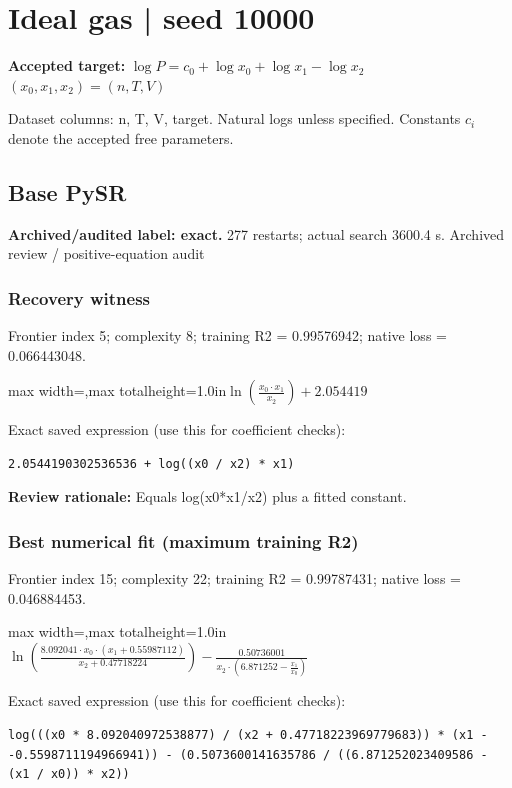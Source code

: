 \documentclass[10pt,letterpaper,landscape]{article}
\begin{document}
\section*{Ideal gas | seed 10000}
\textbf{Accepted target:} $\displaystyle \log P=c_0+\log x_0+\log x_1-\log x_2$\hfill $(x_0,x_1,x_2)=(n,T,V)$\par
{\small Dataset columns: n, T, V, target. Natural logs unless specified. Constants $c_i$ denote the accepted free parameters.}\par\medskip
\begin{minipage}[t]{0.485\textwidth}
\subsection*{Base PySR}
\textbf{Archived/audited label: exact.} 277 restarts; actual search 3600.4 s.
{\small Archived review / positive-equation audit}
\subsubsection*{Recovery witness}
Frontier index 5; complexity 8; training R2 = 0.99576942; native loss = 0.066443048.
\begin{center}\begin{adjustbox}{max width=\linewidth,max totalheight=1.0in}$\displaystyle \ln{\left(\frac{x_{0} \cdot x_{1}}{x_{2}} \right)} + 2.054419$\end{adjustbox}\end{center}
{\scriptsize Exact saved expression (use this for coefficient checks):}
\begin{lstlisting}
2.0544190302536536 + log((x0 / x2) * x1)
\end{lstlisting}
{\small\textbf{Review rationale:} Equals log(x0*x1/x2) plus a fitted constant.}
\subsubsection*{Best numerical fit (maximum training R2)}
Frontier index 15; complexity 22; training R2 = 0.99787431; native loss = 0.046884453.
\begin{center}\begin{adjustbox}{max width=\linewidth,max totalheight=1.0in}$\displaystyle \ln{\left(\frac{8.092041 \cdot x_{0} \cdot \left(x_{1} + 0.55987112\right)}{x_{2} + 0.47718224} \right)} - \frac{0.50736001}{x_{2} \cdot \left(6.871252 - \frac{x_{1}}{x_{0}}\right)}$\end{adjustbox}\end{center}
{\scriptsize Exact saved expression (use this for coefficient checks):}
\begin{lstlisting}
log(((x0 * 8.092040972538877) / (x2 + 0.47718223969779683)) * (x1 - -0.5598711194966941)) - (0.5073600141635786 / ((6.871252023409586 - (x1 / x0)) * x2))
\end{lstlisting}
\end{minipage}\hfill
\end{document}
